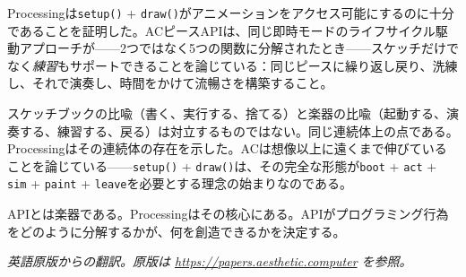 \documentclass[10pt,letterpaper,twocolumn]{article}
\begin{document}
Processingは\texttt{setup()} + \texttt{draw()}がアニメーションをアクセス可能にするのに十分であることを証明した。ACピースAPIは、同じ即時モードのライフサイクル駆動アプローチが——2つではなく5つの関数に分解されたとき——スケッチだけでなく\emph{練習}もサポートできることを論じている：同じピースに繰り返し戻り、洗練し、それで演奏し、時間をかけて流暢さを構築すること。

スケッチブックの比喩（書く、実行する、捨てる）と楽器の比喩（起動する、演奏する、練習する、戻る）は対立するものではない。同じ連続体上の点である。Processingはその連続体の存在を示した。ACは想像以上に遠くまで伸びていることを論じている——\texttt{setup()} + \texttt{draw()}は、その完全な形態が\texttt{boot} + \texttt{act} + \texttt{sim} + \texttt{paint} + \texttt{leave}を必要とする理念の始まりなのである。

APIとは楽器である。Processingはその核心にある。APIがプログラミング行為をどのように分解するかが、何を創造できるかを決定する。

\vspace{0.5em}
\noindent\textit{英語原版からの翻訳。原版は \url{https://papers.aesthetic.computer} を参照。}



\end{document}
